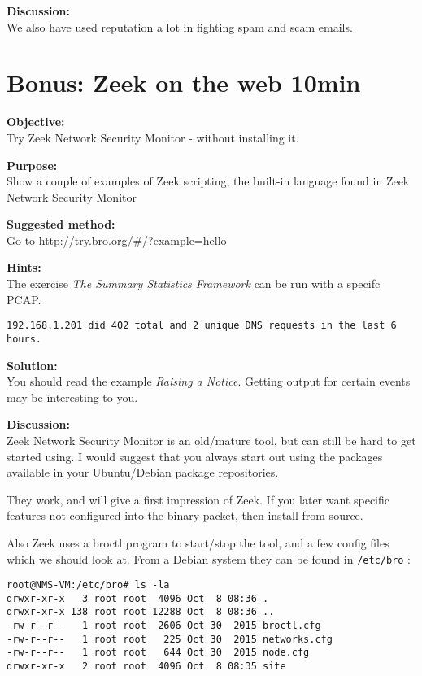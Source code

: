 \documentclass[a4paper,11pt,notitlepage]{report}
\begin{document}
{\bf Discussion:}\\
We also have used reputation a lot in fighting spam and scam emails.



\chapter{Bonus: Zeek on the web 10min}
\label{ex:zeekweb}


{\bf Objective:} \\
Try Zeek Network Security Monitor - without installing it.


{\bf Purpose:}\\
Show a couple of examples of Zeek scripting, the built-in language found in Zeek Network Security Monitor


{\bf Suggested method:}\\
Go to \url{http://try.bro.org/#/?example=hello}

{\bf Hints:}\\
The exercise
\emph{The Summary Statistics Framework} can be run with a specifc PCAP.

\verb+192.168.1.201 did 402 total and 2 unique DNS requests in the last 6 hours.+

{\bf Solution:}\\
You should read the example \emph{Raising a Notice}. Getting output for certain events may be interesting to you.


{\bf Discussion:}\\
Zeek Network Security Monitor is an old/mature tool, but can still be hard to get started using. I would suggest that you always start out using the packages available in your Ubuntu/Debian package repositories.

They work, and will give a first impression of Zeek. If you later want specific features not configured into the binary packet, then install from source.

Also Zeek uses a broctl program to start/stop the tool, and a few config files which we should look at. From a Debian system they can be found in \verb+/etc/bro+ :

\begin{verbatim}
root@NMS-VM:/etc/bro# ls -la
drwxr-xr-x   3 root root  4096 Oct  8 08:36 .
drwxr-xr-x 138 root root 12288 Oct  8 08:36 ..
-rw-r--r--   1 root root  2606 Oct 30  2015 broctl.cfg
-rw-r--r--   1 root root   225 Oct 30  2015 networks.cfg
-rw-r--r--   1 root root   644 Oct 30  2015 node.cfg
drwxr-xr-x   2 root root  4096 Oct  8 08:35 site
\end{verbatim}
\end{document}
